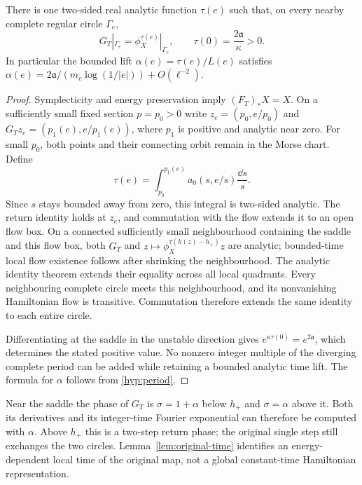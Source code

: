 \begin{lemma}\label{lem:original-time}
There is one two-sided real analytic function $\tau(e)$ such that, on
every nearby complete regular circle $\Gamma_e$,
\begin{equation}\label{hyp:original-time}
 G_T|_{\Gamma_e}=\phi_X^{\tau(e)}|_{\Gamma_e},\qquad
 \tau(0)=\frac{2\mathfrak a}{\kappa}>0.
\end{equation}
In particular the bounded lift $\alpha(e)=\tau(e)/L(e)$ satisfies
$\alpha(e)=2\mathfrak a/(m_c\log(1/|e|))+O(\ell^{-2})$.
\end{lemma}

\begin{proof}
Symplecticity and energy preservation imply $(F_T)_*X=X$.  On a
sufficiently small fixed section $p=p_0>0$ write
$z_e=(p_0,e/p_0)$ and
$G_Tz_e=(p_1(e),e/p_1(e))$, where $p_1$ is positive and analytic near
zero.  For small $p_0$, both points and their connecting orbit remain
in the Morse chart.  Define
\[
 \tau(e)=\int_{p_0}^{p_1(e)}a_0(s,e/s)\frac{\dd s}{s}.
\]
Since $s$ stays bounded away from zero, this integral is two-sided
analytic.  The return identity holds at $z_e$, and commutation with
the flow extends it to an open flow box.  On a connected sufficiently
small neighbourhood containing the saddle and this flow box, both
$G_T$ and $z\mapsto\phi_X^{\tau(h(z)-h_+)}z$ are analytic; bounded-time
local flow existence follows after shrinking the neighbourhood.
The analytic identity theorem extends their equality across all local
quadrants.  Every neighbouring complete circle meets this neighbourhood,
and its nonvanishing Hamiltonian flow is transitive.  Commutation
therefore extends the same identity to each entire circle.

Differentiating at the saddle in the unstable direction gives
$e^{\kappa\tau(0)}=e^{2\mathfrak a}$, which determines the stated
positive value.  No nonzero integer multiple of the diverging complete
period can be added while retaining a bounded analytic time lift.
The formula for $\alpha$ follows from \eqref{hyp:period}.
\end{proof}

Near the saddle the phase of $G_T$ is $\sigma=1+\alpha$ below $h_+$
and $\sigma=\alpha$ above it.  Both its derivatives and its integer-time
Fourier exponential can therefore be computed with $\alpha$.  Above
$h_+$ this is a two-step return phase; the original single step still
exchanges the two circles.  Lemma~\ref{lem:original-time} identifies an
energy-dependent local time of the original map, not a global
constant-time Hamiltonian representation.

